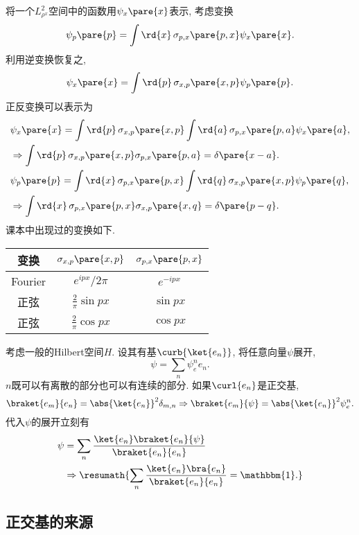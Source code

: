 \documentclass[hidelinks]{ctexart}
\begin{document}
\newpoint{}将一个$L^2_{\rho^x}$空间中的函数用$\psi_x\pare{x}$表示, 考虑变换
\[ \psi_p\pare{p} = \int \rd{x}\, \sigma_{p,x}\pare{p,x} \psi_x\pare{x}. \]
利用逆变换恢复之,
\[ \psi_x\pare{x} = \int \rd{p}\, \sigma_{x,p}\pare{x,p} \psi_p\pare{p}. \]
\newpoint{}正反变换可以表示为
\begin{align*}
    & \psi_x\pare{x} = \int \rd{p}\,\sigma_{x,p}\pare{x,p} \int\rd{a}\,\sigma_{p,x}\pare{p,a}\psi_x\pare{a}, \\
    & \Rightarrow \int \rd{p}\,\sigma_{x,p}\pare{x,p} \sigma_{p,x}\pare{p,a} = \delta\pare{x-a}. \\
    & \psi_p\pare{p} = \int \rd{x}\,\sigma_{p,x}\pare{p,x} \int\rd{q}\,\sigma_{x,p}\pare{x,p}\psi_p\pare{q}, \\
    & \Rightarrow \int \rd{x}\,\sigma_{p,x}\pare{p,x} \sigma_{x,p}\pare{x,q} = \delta\pare{p-q}.
\end{align*}
\newpoint{}课本中出现过的变换如下.
\begin{center}
    \begin{tabular}{ccc}
        变换 & $\sigma_{x,p}\pare{x,p}$ & $\sigma_{p,x}\pare{p,x}$ \\
        \hline
        Fourier & $e^{ipx}/2\pi$ & $e^{-ipx}$ \\
        正弦 & $\displaystyle \frac{2}{\pi} \sin p x$ & $\sin px$ \\[.5em]
        正弦 & $\displaystyle \frac{2}{\pi} \cos p x$ & $\cos px$
    \end{tabular}
\end{center}
\newpoint{}考虑一般的Hilbert空间$H$. 设其有基$\curb{\ket{e_n}}$, 将任意向量$\psi$展开,
\[ \psi = \sum_n \psi_e^n e_n. \]
\newpoint{}$n$既可以有离散的部分也可以有连续的部分.
\newpoint{}如果$\curl{e_n}$是正交基,
\[ \braket{e_m}{e_n} = \abs{\ket{e_n}}^2 \delta_{m,n} \Rightarrow \braket{e_m}{\psi} = \abs{\ket{e_n}}^2 \psi_e^n. \]
\newpoint{}代入$\psi$的展开立刻有
\begin{align*}
    \psi &= \sum_{n} \frac{\ket{e_n}\braket{e_n}{\psi}}{\braket{e_n}{e_n}} \\
    &\Rightarrow \resumath{\sum_n \frac{\ket{e_n}\bra{e_n}}{\braket{e_n}{e_n}} = \mathbbm{1}.}
\end{align*}


\subsection{正交基的来源} %
\label{sub:正交基的来源}
\end{document}
